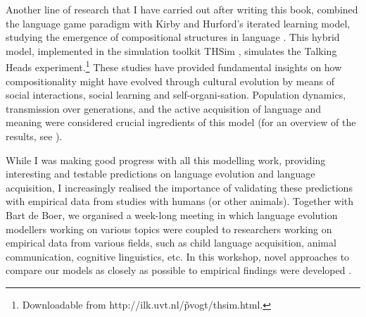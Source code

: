 Another line of research that I have carried out after writing this book, combined the language game paradigm with Kirby and Hurford's \citeyear{kirbyhurford:2002} {\sc iterated learning model}, studying the emergence of compositional structures in language \citep{vogt:2005a,vogt:2005b}. This hybrid model, implemented in the simulation toolkit THSim \citep{vogt:2003c}, simulates the Talking Heads experiment.\footnote{Downloadable from http://ilk.uvt.nl/\~pvogt/thsim.html.} These studies have provided fundamental insights on how compositionality might have evolved through cultural evolution by means of social interactions, social learning and self-organi-sation. Population dynamics, transmission over generations, and the active acquisition of language and meaning were considered crucial ingredients of this model (for an overview of the results, see \citet{vogt:2007b}).  

While I was making good progress with all this modelling work, providing interesting and testable predictions on language evolution and language acquisition, I increasingly realised the importance of validating these predictions with empirical data from studies with humans (or other animals). Together with Bart de Boer, we organised a week-long meeting in which language evolution modellers working on various topics were coupled to researchers working on empirical data from various fields, such as child language acquisition, animal communication, cognitive linguistics, etc. In this workshop, novel approaches to compare our models as closely as possible to empirical findings were developed \citep{vogtdeboer:2010}.

